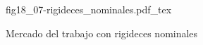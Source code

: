 \begin{figure}[h]
\centering
\def\svgwidth{0.5\textwidth}
{fig18_07-rigideces_nominales.pdf_tex}
\caption{Mercado del trabajo con rigideces nominales}
\label{fig18_07-rigideces_nominales}
\end{figure}